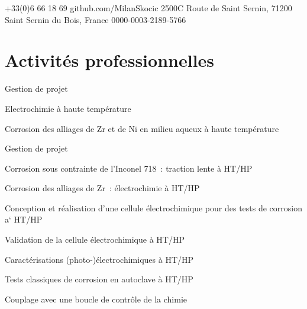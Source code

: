 \documentclass[11pt, a4paper, notitlepage]{article}
\begin{document}
\selectfont
\pagestyle{empty}
	\newpage
	
	
	
	{+33(0)6 66 18 69}
	{github.com/MilanSkocic}
	{2500C Route de Saint Sernin, 71200 Saint Sernin du Bois, France}
	{0000-0003-2189-5766}


	\section*{Activités professionnelles}
	\begin{jobdetails}		
		\item Gestion de projet
		\item Electrochimie à haute température
		\item Corrosion des alliages de Zr et de Ni en milieu aqueux à haute température
	\end{jobdetails}

	\begin{jobdetails}
		\item Gestion de projet
		\item Corrosion sous contrainte de l’Inconel 718 : traction lente à HT/HP
		\item Corrosion des alliages de Zr : électrochimie à HT/HP
	\end{jobdetails}

        \begin{jobdetails}	
		\item Conception et réalisation d’une cellule électrochimique pour des tests de corrosion a` HT/HP
		\item Validation de la cellule électrochimique à HT/HP
		\item Caractérisations (photo-)électrochimiques à HT/HP
		\item Tests classiques de corrosion en autoclave à HT/HP
		\item Couplage avec une boucle de contrôle de la chimie
	\end{jobdetails}
	
\end{document}
